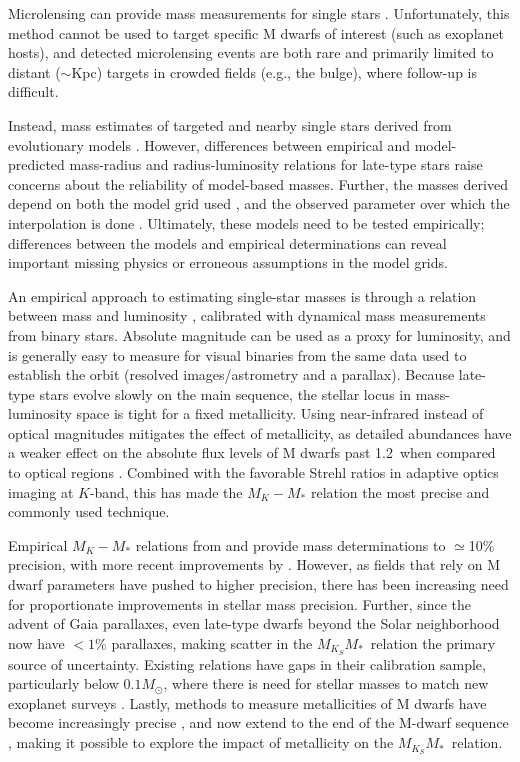 \documentclass[twocolumn]{aastex62}
\newcommand{\mmk}{$M_{K_S}$\textendash$M_*$}
\begin{document}
Microlensing can provide mass measurements for single stars \citep[e.g.,][]{2016ApJ...825...60Z,2017ApJ...838..154C,2017AJ....154..176S}. Unfortunately, this method cannot be used to target specific M dwarfs of interest (such as exoplanet hosts), and detected microlensing events are both rare and primarily limited to distant ($\sim$Kpc) targets in crowded fields (e.g., the bulge), where follow-up is difficult. 

Instead, mass estimates of targeted and nearby single stars derived from evolutionary models \citep[e.g.,][]{Muirhead2012a,2012ApJ...747...69C}. However, differences between empirical and model-predicted mass-radius and radius-luminosity relations for late-type stars \citep[e.g.,][]{Boyajian2012,Feiden2012a} raise concerns about the reliability of model-based masses. Further, the masses derived depend on both the model grid used \citep{Spada2013,MIST1}, and the observed parameter over which the interpolation is done \citep[e.g., color versus luminosity,][]{Mann:2012,Mann2015b}. Ultimately, these models need to be tested empirically; differences between the models and empirical determinations can reveal important missing physics or erroneous assumptions in the model grids. 

An empirical approach to estimating single-star masses is through a relation between mass and luminosity \citep[e.g.,][]{Henry:1993fk, Delfosse2000}, calibrated with dynamical mass measurements from binary stars. Absolute magnitude can be used as a proxy for luminosity, and is generally easy to measure for visual binaries from the same data used to establish the orbit (resolved images/astrometry and a parallax). Because late-type stars evolve slowly on the main sequence, the stellar locus in mass-luminosity space is tight for a fixed metallicity. Using near-infrared instead of optical magnitudes mitigates the effect of metallicity, as detailed abundances have a weaker effect on the absolute flux levels of M dwarfs past 1.2\um\ when compared to optical regions \citep{2005A&A...442..635B,Delfosse2000}. Combined with the favorable Strehl ratios in adaptive optics imaging at $K$-band, this has made the $M_K-M_*$ relation the most precise and commonly used technique. 

Empirical $M_K-M_*$ relations from \citet{Henry:1993fk} and \citet{Delfosse2000} provide mass determinations to $\simeq$10\% precision, with more recent improvements by \citet{Benedict2016}. However, as fields that rely on M dwarf parameters have pushed to higher precision, there has been increasing need for proportionate improvements in stellar mass precision. Further, since the advent of Gaia parallaxes, even late-type dwarfs beyond the Solar neighborhood now have $<1\%$ parallaxes, making scatter in the \mmk\ relation the primary source of uncertainty. Existing relations have gaps in their calibration sample, particularly below $0.1M_\odot$, where there is need for stellar masses to match new exoplanet surveys \citep[e.g.,][]{2017Natur.542..456G}. Lastly, methods to measure metallicities of M dwarfs have become increasingly precise \citep[e.g.,][]{2010ApJ...720L.113R, 2014A&A...568A.121N}, and now extend to the end of the M-dwarf sequence \citep{Mann2014}, making it possible to explore the impact of metallicity on the \mmk\ relation. 
\end{document}
